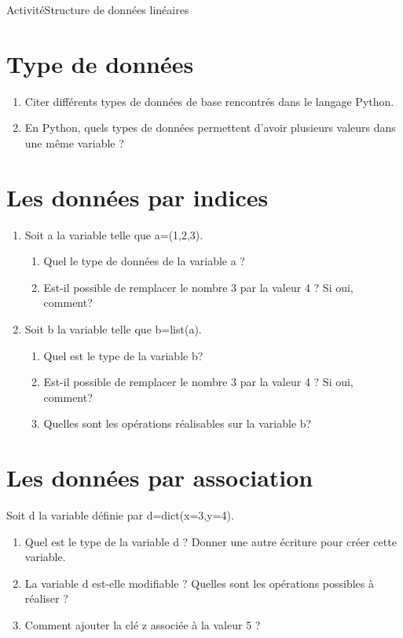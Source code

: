 \documentclass[11pt,a4paper]{article}
\begin{document}
\begin{NSI}
{Activité}{Structure de données linéaires}
\end{NSI}

\section{Type de données}

\begin{enumerate}
\item Citer différents types de données de base rencontrés dans le langage Python.
\item En Python, quels types de données permettent d'avoir plusieurs valeurs dans une même variable ?
\end{enumerate}

\section{Les données par indices}
\begin{enumerate}
\item Soit \textsf{a} la variable telle que \textsf{a=(1,2,3)}.
\begin{enumerate}
\item Quel le type de données de la variable \textsf{a} ?
\item Est-il possible de remplacer le nombre 3 par la valeur 4 ? Si oui, comment?
\end{enumerate}

\item Soit \textsf{b} la variable telle que \textsf{b=list(a)}.
\begin{enumerate}
\item Quel est le type de la variable \textsf{b}?
\item Est-il possible de remplacer le nombre 3 par la valeur 4 ? Si oui, comment?
\item Quelles sont les opérations réalisables sur la variable \textsf{b}?
\end{enumerate}
\end{enumerate}

\section{Les données par association}
Soit \textsf{d} la variable définie par \textsf{d=dict(x=3,y=4)}.
\begin{enumerate}
\item Quel est le type de la variable \textsf{d} ? Donner une autre écriture pour créer cette variable.
\item La variable \textsf{d} est-elle modifiable ? Quelles sont les opérations possibles à réaliser ?
\item Comment ajouter la clé \textsf{z} associée à la valeur 5 ?
\end{enumerate}
\end{document}
